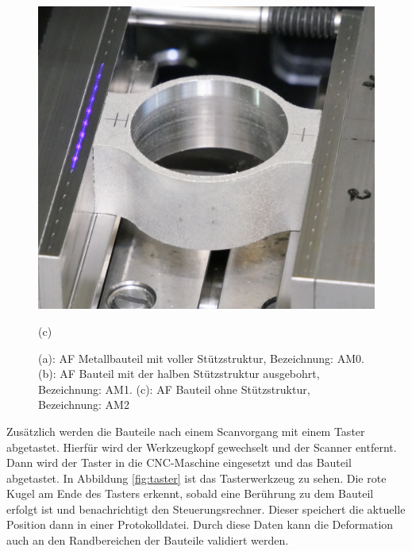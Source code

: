 \begin{figure}[H]
\begin{minipage}{.33\textwidth}
        \centering
        \includegraphics[width=0.9\linewidth]{images/AM2_crop.JPG}
        \caption*{(c)}
      \end{minipage}
      \caption{(a): AF Metallbauteil mit voller Stützstruktur, Bezeichnung: AM0.
      (b): AF Bauteil mit der halben Stützstruktur ausgebohrt, Bezeichnung: AM1.
      (c): AF Bauteil ohne Stützstruktur, Bezeichnung: AM2}
      \label{fig:am_parts}
\end{figure}
    
Zusätzlich werden die Bauteile nach einem Scanvorgang mit einem Taster 
abgetastet. Hierfür wird der Werkzeugkopf gewechselt und der Scanner entfernt.
Dann wird der Taster in die CNC-Maschine eingesetzt und das Bauteil abgetastet.
In Abbildung \ref{fig:taster} ist das Tasterwerkzeug zu sehen. Die rote Kugel 
am Ende des Tasters erkennt, sobald eine Berührung zu dem Bauteil erfolgt ist 
und benachrichtigt den Steuerungsrechner. Dieser speichert die aktuelle Position 
dann in einer Protokolldatei. Durch diese Daten kann die Deformation auch an 
den Randbereichen der Bauteile validiert werden.